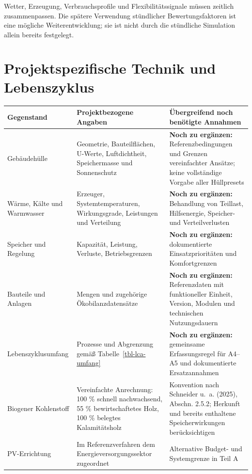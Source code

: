 \documentclass[
  ngerman,
  a4paper,
  DIV=11]{scrreprt}
\newcounter{none} %
\begin{document}
Wetter, Erzeugung, Verbrauchsprofile und Flexibilitätssignale müssen
zeitlich zusammenpassen. Die spätere Verwendung stündlicher
Bewertungsfaktoren ist eine mögliche Weiterentwicklung; sie ist nicht
durch die stündliche Simulation allein bereits festgelegt.

\section{Projektspezifische Technik und
Lebenszyklus}\label{projektspezifische-technik-und-lebenszyklus}

{\def\LTcaptype{none} %
\begin{longtable}[]{@{}
  >{\raggedright\arraybackslash}p{}
  >{\raggedright\arraybackslash}p{}
  >{\raggedright\arraybackslash}p{}@{}}
\toprule\noalign{}
\begin{minipage}[b]{\linewidth}\raggedright
Gegenstand
\end{minipage} & \begin{minipage}[b]{\linewidth}\raggedright
Projektbezogene Angaben
\end{minipage} & \begin{minipage}[b]{\linewidth}\raggedright
Übergreifend noch benötigte Annahmen
\end{minipage} \\
\midrule\noalign{}
\endhead
\bottomrule\noalign{}
\endlastfoot
Gebäudehülle & Geometrie, Bauteilflächen, U-Werte, Luftdichtheit,
Speichermasse und Sonnenschutz & \textbf{Noch zu ergänzen:}
Referenzbedingungen und Grenzen vereinfachter Ansätze; keine
vollständige Vorgabe aller Hüllpresets \\
Wärme, Kälte und Warmwasser & Erzeuger, Systemtemperaturen,
Wirkungsgrade, Leistungen und Verteilung & \textbf{Noch zu ergänzen:}
Behandlung von Teillast, Hilfsenergie, Speicher- und Verteilverlusten \\
Speicher und Regelung & Kapazität, Leistung, Verluste, Betriebsgrenzen &
\textbf{Noch zu ergänzen:} dokumentierte Einsatzprioritäten und
Komfortgrenzen \\
Bauteile und Anlagen & Mengen und zugehörige Ökobilanzdatensätze &
\textbf{Noch zu ergänzen:} Referenzdaten mit funktioneller Einheit,
Version, Modulen und technischen Nutzungsdauern \\
Lebenszyklusumfang & Prozesse und Abgrenzung gemäß
Tabelle~\ref{tbl-lca-umfang} & \textbf{Noch zu ergänzen:} gemeinsame
Erfassungsregel für A4--A5 und dokumentierte Ersatzannahmen \\
Biogener Kohlenstoff & Vereinfachte Anrechnung: 100 \% schnell
nachwachsend, 55 \% bewirtschaftetes Holz, 100 \% belegtes
Kalamitätsholz & Konvention nach Schneider u.~a. (2025), Abschn. 2.5.2;
Herkunft und bereits enthaltene Speicherwirkungen berücksichtigen \\
PV-Errichtung & Im Referenzverfahren dem Energieversorgungssektor
zugeordnet & Alternative Budget- und Systemgrenze in Teil A \\
\end{longtable}
}
\end{document}
